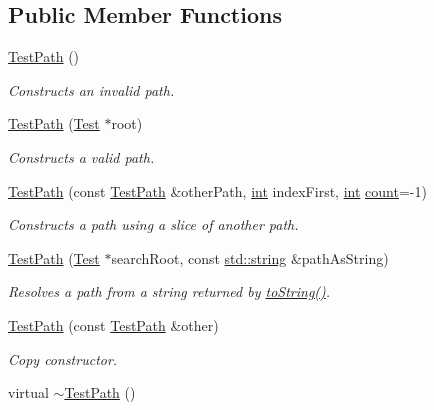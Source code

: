 \subsection*{Public Member Functions}
\begin{DoxyCompactItemize}
\item 
\hyperlink{class_test_path_ab1fd9894ea271a225b95384497bc420e}{Test\-Path} ()
\begin{DoxyCompactList}\small\item\em Constructs an invalid path. \end{DoxyCompactList}\item 
\hyperlink{class_test_path_a12d673c5e1e107cdc7746264d01234d8}{Test\-Path} (\hyperlink{class_test}{Test} $\ast$root)
\begin{DoxyCompactList}\small\item\em Constructs a valid path. \end{DoxyCompactList}\item 
\hyperlink{class_test_path_a88605df3449265ce0dd0533399cc2b6d}{Test\-Path} (const \hyperlink{class_test_path}{Test\-Path} \&other\-Path, \hyperlink{wglew_8h_a500a82aecba06f4550f6849b8099ca21}{int} index\-First, \hyperlink{wglew_8h_a500a82aecba06f4550f6849b8099ca21}{int} \hyperlink{_free_image_8h_a10b284d589000663becfbc6867a3a9f7}{count}=-\/1)
\begin{DoxyCompactList}\small\item\em Constructs a path using a slice of another path. \end{DoxyCompactList}\item 
\hyperlink{class_test_path_a5855701e39a328a19f9780a130106cb3}{Test\-Path} (\hyperlink{class_test}{Test} $\ast$search\-Root, const \hyperlink{glew_8h_ae84541b4f3d8e1ea24ec0f466a8c568b}{std\-::string} \&path\-As\-String)
\begin{DoxyCompactList}\small\item\em Resolves a path from a string returned by \hyperlink{class_test_path_a75ec4a351f0734cefbf449325d7442ee}{to\-String()}. \end{DoxyCompactList}\item 
\hyperlink{class_test_path_a616f81a2ed0ddeb1dbb6f83d0b58ee47}{Test\-Path} (const \hyperlink{class_test_path}{Test\-Path} \&other)
\begin{DoxyCompactList}\small\item\em Copy constructor. \end{DoxyCompactList}\item 
virtual \hyperlink{class_test_path_aae2b4ad848df0da549059e6ab146eca2}{$\sim$\-Test\-Path} ()

\end{DoxyCompactItemize}
